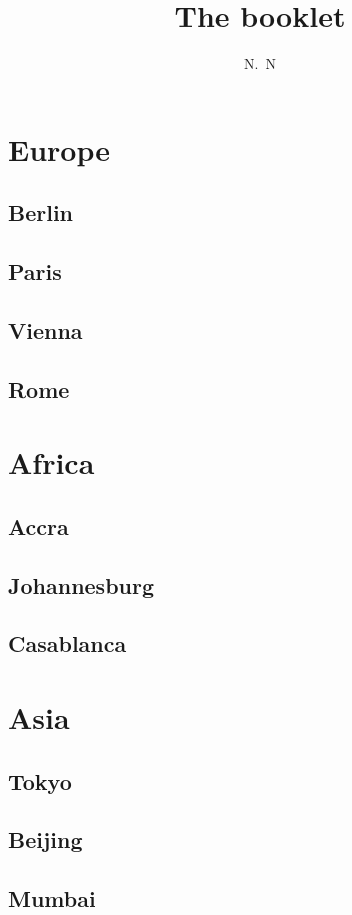 \documentclass[12pt]{article}
\author{N.~N}
\title{The booklet}
\begin{document}
\maketitle

\section{Europe}
\subsection{Berlin}
\lipsum[4]
\subsection{Paris}
\lipsum[1-3]
\subsection{Vienna}
\lipsum[10]
\subsection{Rome}
\lipsum[15]
\section{Africa}
\lipsum[1-4]
\subsection{Accra}
\lipsum[5-8]
\subsection{Johannesburg}
\lipsum[9-11]
\subsection{Casablanca}
\lipsum[11-12]
\lipsum[5-6]
\section{Asia}
\lipsum[1-4]
\subsection{Tokyo}
\lipsum[5-8]
\subsection{Beijing}
\lipsum[9-11]
\subsection{Mumbai}
\lipsum[11-12]
\lipsum[5-6]
\end{document}
